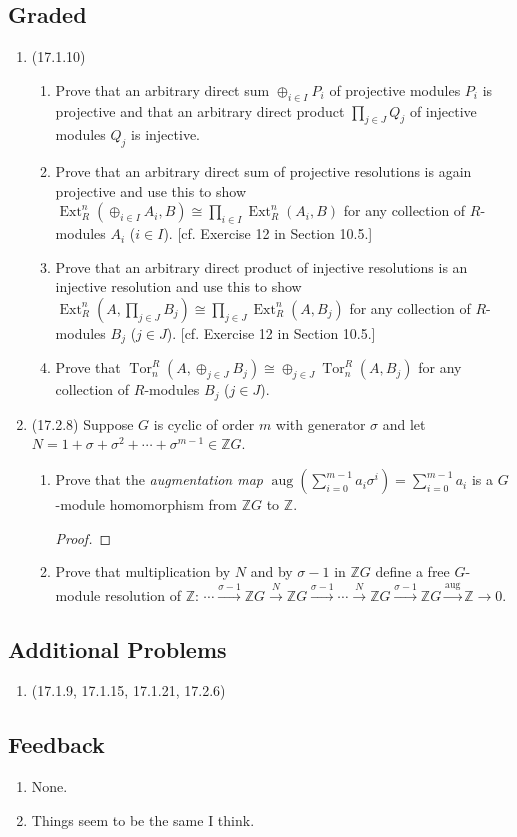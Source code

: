 \documentclass[11pt]{article}
\DeclareMathOperator{\Tor}{Tor}
\DeclareMathOperator{\Ext}{Ext}
\DeclareMathOperator{\aug}{aug}
\begin{document}
\subsection*{Graded}
\begin{enumerate}
    \item (17.1.10) \begin{enumerate}
        \item Prove that an arbitrary direct sum $\oplus_{i\in I}P_i$ of projective modules $P_i$ is projective and that an arbitrary direct product $\prod_{j\in J}Q_j$ of injective modules $Q_j$ is injective.
        \item Prove that an arbitrary direct sum of projective resolutions is again projective and use this to show $\Ext_R^n(\oplus_{i\in I}A_i, B)\cong \prod_{i\in I}\Ext_R^n(A_i,B)$ for any collection of $R$-modules $A_i$ ($i\in I$). [cf. Exercise 12 in Section 10.5.]
        \item Prove that an arbitrary direct product of injective resolutions is an injective resolution and use this to show $\Ext_R^n(A,\prod_{j\in J}B_j)\cong \prod_{j\in J}\Ext_R^n(A,B_j)$ for any collection of $R$-modules $B_j$ ($j\in J$). [cf. Exercise 12 in Section 10.5.]
        \item Prove that $\Tor_n^R(A,\oplus_{j\in J}B_j)\cong \oplus_{j\in J}\Tor_n^R(A,B_j)$ for any collection of $R$-modules $B_j$ ($j\in J$).
    \end{enumerate}
    \item (17.2.8) Suppose $G$ is cyclic of order $m$ with generator $\sigma$ and let $N = 1+\sigma + \sigma^2 + \cdots + \sigma^{m-1}\in\mathbb{Z}G$.\begin{enumerate}
        \item Prove that the \textit{augmentation map} $\aug(\sum_{i=0}^{m-1}a_i\sigma^i) = \sum_{i=0}^{m-1}a_i$ is a $G$-module homomorphism from $\mathbb{Z}G$ to $\mathbb{Z}$. \begin{proof}
            
        \end{proof}
        \item Prove that multiplication by $N$ and by $\sigma-1$ in $\mathbb{Z}G$ define a free $G$-module resolution of $\mathbb{Z}$: $\cdots\xrightarrow{\sigma-1}\mathbb{Z}G\xrightarrow{N}\mathbb{Z}G\xrightarrow{\sigma-1}\cdots\xrightarrow{N}\mathbb{Z}G\xrightarrow{\sigma-1}\mathbb{Z}G\xrightarrow{\aug}\mathbb{Z}\to 0$.
    \end{enumerate}
\end{enumerate}
\subsection*{Additional Problems}
\begin{enumerate}
    \item (17.1.9, 17.1.15, 17.1.21, 17.2.6)
\end{enumerate}
\subsection*{Feedback}
\begin{enumerate}
    \item None.
    \item Things seem to be the same I think.
\end{enumerate}
\end{document}
